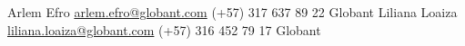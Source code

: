 

\begin{cvhonors}

  \cvhonor
    {Arlem Efro} %
    {\href{mailto:arlem.efro@globant.com}{arlem.efro@globant.com}} %
    {(+57) 317 637 89 22} %
    {Globant} %
  \cvhonor
    {Liliana Loaiza} %
    {\href{mailto:liliana.loaiza@globant.com}{liliana.loaiza@globant.com}} %
    {(+57) 316 452 79 17} %
    {Globant} %

\end{cvhonors}
